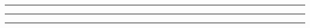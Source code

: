 








\setlength{\columnseprule}{0.5pt}



\clearpage
\begin{multicols}{2}
\setcounter{tocdepth}{3} %
\tableofcontents

\vspace{0.5\baselineskip} 
\hrule

\end{multicols}

\clearpage
\standardKopfzeile
\begin{multicols*}{2}

\addtocounter{section}{-1}
\hrule


\hrule

\end{multicols*}

\clearpage

\newcommand{\partcolor}{\color{NavyBlue}}


\begin{multicols*}{2}























\clearpage
\end{multicols*}
	\appendix	%
	\AnhangKopfzeile

